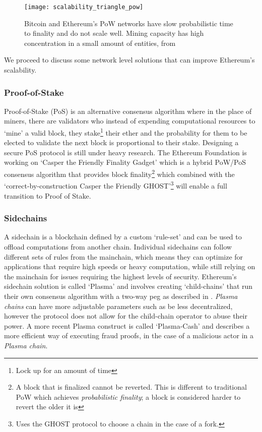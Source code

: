 \begin{figure}[H]
    \centering
    \texttt{[image: scalability\_triangle\_pow]}
    \caption{Bitcoin and Ethereum's PoW networks have slow probabilistic time to finality and do not scale well. Mining capacity has high concentration in a small amount of entities, from \cite{scaling-trustless-models}}
    \label{fig:scalability_triangle_pow}
\end{figure}

We proceed to discuss some network level solutions that can improve Ethereum's scalability.

\subsubsection{Proof-of-Stake}
Proof-of-Stake (PoS) is an alternative consensus algorithm where in the place of miners, there are validators who instead of expending computational resources to `mine' a valid block, they stake\footnote{Lock up for an amount of time} their ether and the probability for them to be elected to validate the next block is proportional to their stake. Designing a secure PoS protocol is still under heavy research. The Ethereum Foundation is working on `Casper the Friendly Finality Gadget'\cite{casperffg} which is a hybrid PoW/PoS consensus algorithm that provides block finality\footnote{A block that is finalized cannot be reverted. This is different to traditional PoW which achieves \textit{probabilistic finality}; a block is considered harder to revert the older it is} which combined with the `correct-by-construction Casper the Friendly GHOST'\footnote{Uses the GHOST protocol to choose a chain in the case of a fork.} \cite{caspertfg} will enable a full transition to Proof of Stake. 

\subsubsection{Sidechains}
A sidechain \cite{sidechains} is a blockchain defined by a custom `rule-set' and can be used to offload computations from another chain. Individual sidechains can follow different sets of rules from the mainchain, which means they can optimize for applications that require high speeds or heavy computation, while still relying on the mainchain for issues requiring the highest levels of security. Ethereum's sidechain solution is called `Plasma' \cite{plasma} and involves creating `child-chains' that run their own consensus algorithm with a two-way peg as described in \cite{sidechains}. \textit{Plasma chains} can have more adjustable parameters such as be less decentralized, however the protocol does not allow for the child-chain operator to abuse their power. A more recent Plasma construct is called `Plasma-Cash' \cite{plasmacash} and describes a more efficient way of executing fraud proofs, in the case of a malicious actor in a \textit{Plasma chain}.

